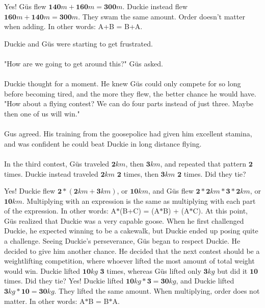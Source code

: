 {Yes! Güs flew $\mathbf{140} m + \mathbf{160} m = \mathbf{300} m$. Duckie instead flew $\mathbf{160} m + \mathbf{140} m = \mathbf{300} m$. They swam the same amount.}
{Order doesn't matter when adding. In other words: A+B = B+A.}
{}
{Duckie and Güs were starting to get frustrated. 
\paragraph{} "How are we going to get around this?" Güs asked.
\paragraph{} Duckie thought for a moment. He knew Güs could only compete for so long before becoming tired, and the more they flew, the better chance he would have. "How about a flying contest? We can do four parts instead of just three. Maybe then one of us will win."
\paragraph{} Gus agreed. His training from the goosepolice had given him excellent stamina, and was confident he could beat Duckie in long distance flying. 
\paragraph{} In the third contest, Güs traveled $\mathbf{2} km$, then $\mathbf{3} km$, and repeated that pattern $\mathbf{2}$ times. Duckie instead traveled $\mathbf{2} km$ $\mathbf{2}$ times, then $\mathbf{3} km$ $\mathbf{2}$ times. Did they tie?}
{Yes! Duckie flew $\mathbf{2}\ast(\mathbf{2} km + \mathbf{3} km)$, or $\mathbf{10} km$, and Güs flew $\mathbf{2}\ast\mathbf{2} km \ast \mathbf{3}\ast\mathbf{2} km$, or $\mathbf{10}km$.}
{Multiplying with an expression is the same as multiplying with each part of the expression. In other words: A$\ast$(B+C) = (A$\ast$B) + (A$\ast$C).}
{}
{At this point, Güs realized that Duckie was a very capable goose. When he first challenged Duckie, he expected winning to be a cakewalk, but Duckie ended up posing quite a challenge. Seeing Duckie's perseverance, Güs began to respect Duckie. He decided to give him another chance. He decided that the next contest should be a weightlifting competition, where whoever lifted the most amount of total weight would win. Duckie lifted $\mathbf{10} kg$  $\mathbf{3}$ times, whereas Güs lifted only $\mathbf{3} kg$ but did it $\mathbf{10}$ times. Did they tie?}
{Yes! Duckie lifted $\mathbf{10}kg\ast\mathbf{3}=\mathbf{30}kg$, and Duckie lifted $\mathbf{3}kg \ast \mathbf{10}=\mathbf{30}kg$. They lifted the same amount.}
{When multiplying, order does not matter. In other words: A$\ast$B = B$\ast$A.}
{}
